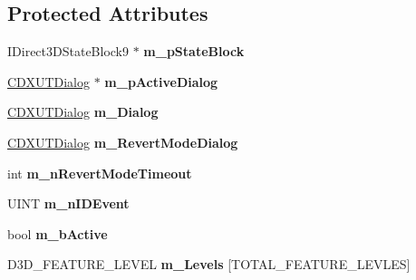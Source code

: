 \subsection*{Protected Attributes}
\begin{DoxyCompactItemize}
\item 
\hypertarget{class_c_d3_d_settings_dlg_af8e1e88711501924bd091fe0792cb489}{I\+Direct3\+D\+State\+Block9 $\ast$ {\bfseries m\+\_\+p\+State\+Block}}\label{class_c_d3_d_settings_dlg_af8e1e88711501924bd091fe0792cb489}

\item 
\hypertarget{class_c_d3_d_settings_dlg_a44f8fe3eb1152ca31ea22bdfb97b1d9d}{\hyperlink{class_c_d_x_u_t_dialog}{C\+D\+X\+U\+T\+Dialog} $\ast$ {\bfseries m\+\_\+p\+Active\+Dialog}}\label{class_c_d3_d_settings_dlg_a44f8fe3eb1152ca31ea22bdfb97b1d9d}

\item 
\hypertarget{class_c_d3_d_settings_dlg_a6653f7f7899c31f909c2d7542babc521}{\hyperlink{class_c_d_x_u_t_dialog}{C\+D\+X\+U\+T\+Dialog} {\bfseries m\+\_\+\+Dialog}}\label{class_c_d3_d_settings_dlg_a6653f7f7899c31f909c2d7542babc521}

\item 
\hypertarget{class_c_d3_d_settings_dlg_a508044a1b60f2195c887d93a8c6a1aaa}{\hyperlink{class_c_d_x_u_t_dialog}{C\+D\+X\+U\+T\+Dialog} {\bfseries m\+\_\+\+Revert\+Mode\+Dialog}}\label{class_c_d3_d_settings_dlg_a508044a1b60f2195c887d93a8c6a1aaa}

\item 
\hypertarget{class_c_d3_d_settings_dlg_a47c332e7cdbee53ba34ccd803cf36dba}{int {\bfseries m\+\_\+n\+Revert\+Mode\+Timeout}}\label{class_c_d3_d_settings_dlg_a47c332e7cdbee53ba34ccd803cf36dba}

\item 
\hypertarget{class_c_d3_d_settings_dlg_a48fc888075c42436483b2b5d84e9f127}{U\+I\+N\+T {\bfseries m\+\_\+n\+I\+D\+Event}}\label{class_c_d3_d_settings_dlg_a48fc888075c42436483b2b5d84e9f127}

\item 
\hypertarget{class_c_d3_d_settings_dlg_ad080d36c3e4fc29a7909a7962b11fa78}{bool {\bfseries m\+\_\+b\+Active}}\label{class_c_d3_d_settings_dlg_ad080d36c3e4fc29a7909a7962b11fa78}

\item 
\hypertarget{class_c_d3_d_settings_dlg_a2c8b1b4b9c914112a18e7d00648ed56c}{D3\+D\+\_\+\+F\+E\+A\+T\+U\+R\+E\+\_\+\+L\+E\+V\+E\+L {\bfseries m\+\_\+\+Levels} \mbox{[}T\+O\+T\+A\+L\+\_\+\+F\+E\+A\+T\+U\+R\+E\+\_\+\+L\+E\+V\+L\+E\+S\mbox{]}}\label{class_c_d3_d_settings_dlg_a2c8b1b4b9c914112a18e7d00648ed56c}

\end{DoxyCompactItemize}
